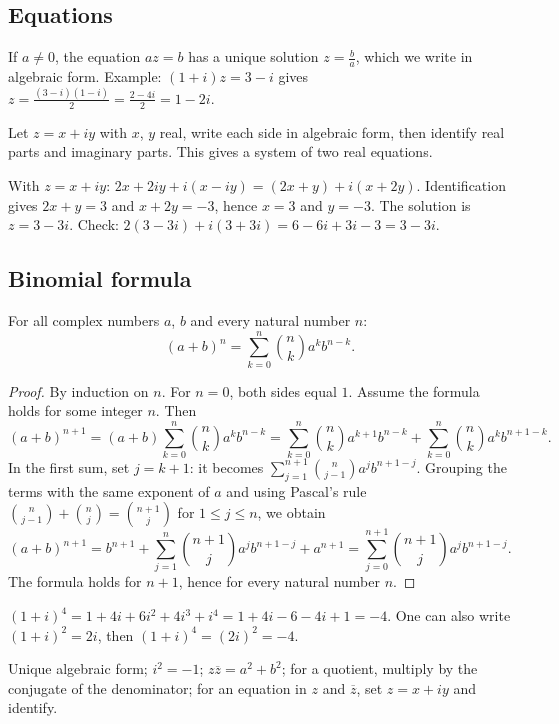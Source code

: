 \subsection{Equations}
\begin{method}
If $a\neq0$, the equation $az=b$ has a unique solution $z=\frac ba$, which we write in algebraic form. Example: $(1+i)z=3-i$ gives $z=\frac{(3-i)(1-i)}{2}=\frac{2-4i}{2}=1-2i$.
\end{method}
\begin{method}
Let $z=x+iy$ with $x$, $y$ real, write each side in algebraic form, then identify real parts and imaginary parts. This gives a system of two real equations.
\end{method}
\begin{example}[Solving $2z+i\overline z=3-3i$]
With $z=x+iy$: $2x+2iy+i(x-iy)=(2x+y)+i(x+2y)$. Identification gives $2x+y=3$ and $x+2y=-3$, hence $x=3$ and $y=-3$. The solution is $z=3-3i$. Check: $2(3-3i)+i(3+3i)=6-6i+3i-3=3-3i$.
\end{example}

\subsection{Binomial formula}
\begin{theorem}
For all complex numbers $a$, $b$ and every natural number $n$:
\[(a+b)^n=\sum_{k=0}^{n}\binom nk a^kb^{n-k}.\]
\end{theorem}
\begin{proof}
By induction on $n$. For $n=0$, both sides equal $1$. Assume the formula holds for some integer $n$. Then
\[(a+b)^{n+1}=(a+b)\sum_{k=0}^{n}\binom nk a^kb^{n-k}=\sum_{k=0}^{n}\binom nk a^{k+1}b^{n-k}+\sum_{k=0}^{n}\binom nk a^kb^{n+1-k}.\]
In the first sum, set $j=k+1$: it becomes $\sum_{j=1}^{n+1}\binom n{j-1}a^jb^{n+1-j}$. Grouping the terms with the same exponent of $a$ and using Pascal's rule $\binom n{j-1}+\binom nj=\binom{n+1}j$ for $1\le j\le n$, we obtain
\[(a+b)^{n+1}=b^{n+1}+\sum_{j=1}^{n}\binom{n+1}j a^jb^{n+1-j}+a^{n+1}=\sum_{j=0}^{n+1}\binom{n+1}j a^jb^{n+1-j}.\]
The formula holds for $n+1$, hence for every natural number $n$.
\end{proof}
\begin{example}[A power of $1+i$]
$(1+i)^4=1+4i+6i^2+4i^3+i^4=1+4i-6-4i+1=-4$. One can also write $(1+i)^2=2i$, then $(1+i)^4=(2i)^2=-4$.
\end{example}
\begin{keypoint}
Unique algebraic form; $i^2=-1$; $z\overline z=a^2+b^2$; for a quotient, multiply by the conjugate of the denominator; for an equation in $z$ and $\overline z$, set $z=x+iy$ and identify.
\end{keypoint}

